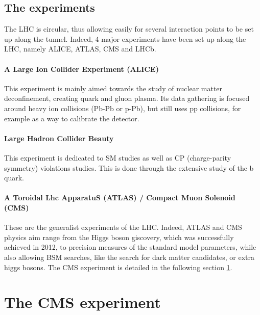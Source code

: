 \subsection{The experiments}

The LHC is circular, thus allowing easily for several interaction points to be set up along the tunnel. Indeed, 4 major experiments have been set up along the LHC, namely ALICE, ATLAS, CMS and LHCb.

\paragraph{A Large Ion Collider Experiment (ALICE)} This experiment is mainly aimed towards the study of nuclear matter deconfinement, creating quark and gluon plasma. Its data gathering is focused around heavy ion collisions (Pb-Pb or p-Pb), but still uses pp collisions, for example as a way to calibrate the detector.

\paragraph{Large Hadron Collider Beauty} This experiment is dedicated to SM studies as well as CP (charge-parity symmetry) violations studies. This is done through the extensive study of the b quark.

\paragraph{A Toroidal Lhc ApparatuS (ATLAS) / Compact Muon Solenoid (CMS)} These are the generalist experiments of the LHC. Indeed, ATLAS and CMS physics aim range from the Higgs boson giscovery, which was successfully achieved in 2012, to precision measures of the standard model parameters, while also allowing BSM searches, like the search for dark matter candidates, or extra higgs bosons. The CMS experiment is detailed in the following section \ref{sec:CMS}.


\section{The CMS experiment}
\label{sec:CMS}

